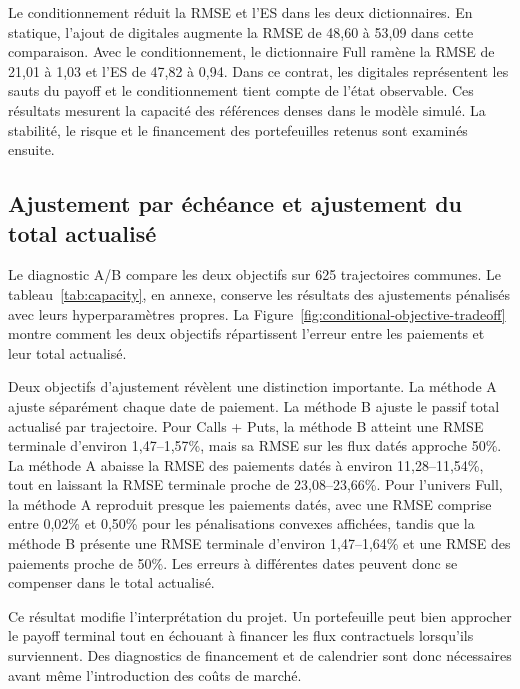Le conditionnement réduit la RMSE et l'ES dans les deux dictionnaires. En statique, l'ajout de digitales augmente la RMSE de 48,60 à 53,09 dans cette comparaison. Avec le conditionnement, le dictionnaire Full ramène la RMSE de 21,01 à 1,03 et l'ES de 47,82 à 0,94. Dans ce contrat, les digitales représentent les sauts du payoff et le conditionnement tient compte de l'état observable. Ces résultats mesurent la capacité des références denses dans le modèle simulé. La stabilité, le risque et le financement des portefeuilles retenus sont examinés ensuite.

\subsection{Ajustement par échéance et ajustement du total actualisé}

Le diagnostic A/B compare les deux objectifs sur 625 trajectoires communes. Le tableau~\ref{tab:capacity}, en annexe, conserve les résultats des ajustements pénalisés avec leurs hyperparamètres propres. La Figure~\ref{fig:conditional-objective-tradeoff} montre comment les deux objectifs répartissent l'erreur entre les paiements et leur total actualisé.

Deux objectifs d'ajustement révèlent une distinction importante. La méthode A ajuste séparément chaque date de paiement. La méthode B ajuste le passif total actualisé par trajectoire. Pour Calls + Puts, la méthode B atteint une RMSE terminale d'environ 1,47--1,57\%, mais sa RMSE sur les flux datés approche 50\%. La méthode A abaisse la RMSE des paiements datés à environ 11,28--11,54\%, tout en laissant la RMSE terminale proche de 23,08--23,66\%. Pour l'univers Full, la méthode A reproduit presque les paiements datés, avec une RMSE comprise entre 0,02\% et 0,50\% pour les pénalisations convexes affichées, tandis que la méthode B présente une RMSE terminale d'environ 1,47--1,64\% et une RMSE des paiements proche de 50\%. Les erreurs à différentes dates peuvent donc se compenser dans le total actualisé.


Ce résultat modifie l'interprétation du projet. Un portefeuille peut bien approcher le payoff terminal tout en échouant à financer les flux contractuels lorsqu'ils surviennent. Des diagnostics de financement et de calendrier sont donc nécessaires avant même l'introduction des coûts de marché.

